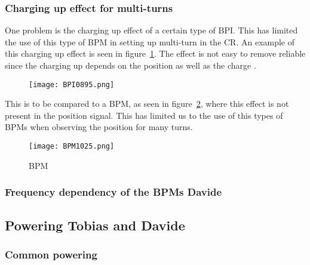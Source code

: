 \subsubsection{Charging up effect for multi-turns}
One problem is the charging up effect of a certain type of BPI. This has limited the use of this type of BPM in setting up multi-turn in the CR. An example of this charging up effect is seen in figure~\ref{fig:bpi_charging_up}. The effect is not easy to remove reliable since the charging up depends on the position as well as the charge \cite{ben_constance_chargingUp}. 
\begin{figure}
\begin{center}
 \texttt{[image: BPI0895.png]}
 \caption{}
\label{fig:bpi_charging_up}
\end{center}
\end{figure}

This is to be compared to a BPM, as seen in figure~\ref{fig:bpm_not_charging_up}, where this effect is not present in the position signal. This has limited us to the use of this types of BPMs when observing the position for many turns. 

\begin{figure}
\begin{center}
 \texttt{[image: BPM1025.png]}
 \caption{BPM}
\label{fig:bpm_not_charging_up}
\end{center}
\end{figure}


\subsubsection{Frequency dependency of the BPMs \textbf{Davide}}
\subsection{Powering \textbf{Tobias and Davide}}
\subsubsection{Common powering}
